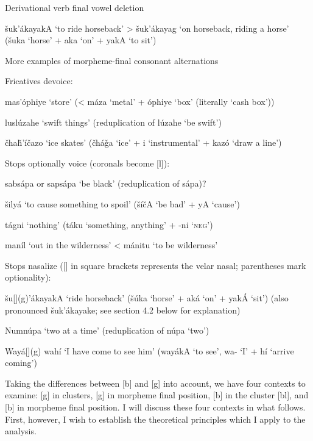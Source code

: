 \documentclass[output=paper]{LSP/langsci}
\begin{document}
\begin{exe}\label{ex:rood:7}
\ex Derivational verb final vowel deletion

\v{s}uk'\'akayakA `to ride horseback' > \v{s}uk'\'akayag `on horseback, riding a horse' (\v{s}uka `horse' + aka `on' + yakA `to sit')
\end{exe}

\begin{exe}\label{ex:rood:8}
\ex More examples of morpheme-final consonant alternations
\begin{xlist}
\ex Fricatives devoice:

mas'\'ophiye `store' (< m\'aza `metal' + \'ophiye `box' (literally `cash box'))

lusl\'uzahe `swift things' (reduplication of l\'uzahe `be swift')

\v{c}ha\v{h}'\'i\v{c}azo `ice skates' (\v{c}h\'a\v{g}a `ice' + i `instrumental' + kaz\'o `draw a line')

\ex Stops optionally voice (coronals become [l]):

sabs\'apa or saps\'apa `be black' (reduplication of s\'apa)?

\v{s}ily\'a `to cause something to spoil' (\v{s}\'i\v{c}A `be bad' + yA `cause')

t\'agni `nothing' (t\'aku `something, anything' + -ni `\textsc{neg}')

man\'il `out in the wilderness' < m\'anitu `to be wilderness'

\ex Stops nasalize ([] in square brackets represents the velar nasal; parentheses mark optionality):

\v{s}u[](g)'\'akayakA `ride horseback' (\v{s}\'uka `horse' + ak\'a `on' + yak\'A `sit') (also pronounced \v{s}uk'\'akayake; see section 4.2 below for explanation)

Numn\'upa `two at a time' (reduplication of n\'upa `two')

Way\'a[](g) wah\'i `I have come to see him' (way\'akA `to see', wa- `I' + h\'i `arrive coming')
\end{xlist}
\end{exe}

Taking the differences between [b] and [g] into account, we have four contexts to examine: [g] in clusters, [g] in morpheme final position, [b] in the cluster [bl], and [b] in morpheme final position. I will discuss these four contexts in what follows. First, however, I wish to establish the theoretical principles which I apply to the analysis.
\end{document}
